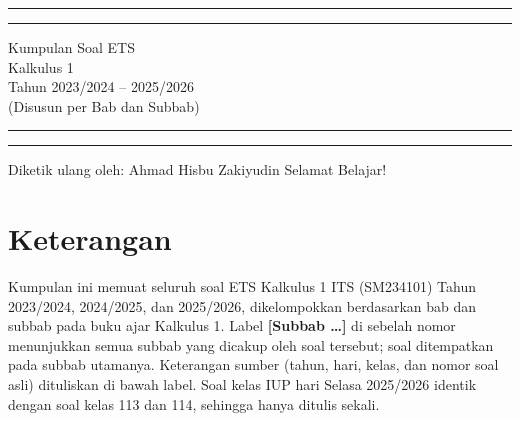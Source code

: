 \documentclass[10pt,openany,a4paper]{article}
\theoremstyle{definition}
\theoremstyle{definition}
\theoremstyle{plain}
\begin{document}
\begin{titlepage}
	\centering %
	\vspace*{1.5\baselineskip} %

	\rule{13cm}{1.6pt}\vspace*{-\baselineskip}\vspace*{2pt} %
	\rule{13cm}{0.4pt} %
	
		\vspace{0.75\baselineskip} %
	{	\Huge Kumpulan Soal ETS\\ 
			\vspace{4mm}
		Kalkulus 1 \\ \vspace{2mm} \huge{Tahun 2023/2024 -- 2025/2026}\\ \vspace{2mm} \Large{(Disusun per Bab dan Subbab)}\\	}
		\vspace{0.75\baselineskip} %
	\rule{13cm}{0.4pt}\vspace*{-\baselineskip}\vspace{3.2pt} %
	\rule{13cm}{1.6pt} %
	
		\vspace{1.75\baselineskip} %
{\large Diketik ulang oleh: Ahmad Hisbu Zakiyudin}
	\vfill
	\vspace{1mm}
\huge{Selamat Belajar!}
\end{titlepage}
\makeatletter
\setlength\fboxsep{3pt}
\setlength{\headheight}{24pt}

\setlength{\headheight}{24pt}

\section*{Keterangan}
Kumpulan ini memuat seluruh soal ETS Kalkulus 1 ITS (SM234101) Tahun 2023/2024, 2024/2025, dan 2025/2026, dikelompokkan berdasarkan bab dan subbab pada buku ajar Kalkulus 1. Label \textbf{[Subbab \dots]} di sebelah nomor menunjukkan semua subbab yang dicakup oleh soal tersebut; soal ditempatkan pada subbab utamanya. Keterangan sumber (tahun, hari, kelas, dan nomor soal asli) dituliskan di bawah label. Soal kelas IUP hari Selasa 2025/2026 identik dengan soal kelas 113 dan 114, sehingga hanya ditulis sekali.
\end{document}
